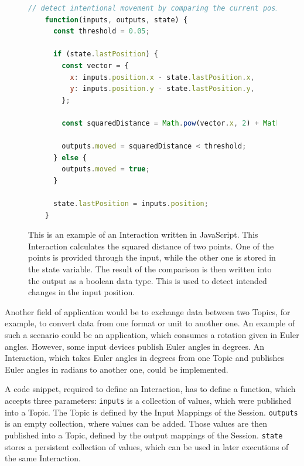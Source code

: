 \begin{figure}[H]
	\begin{lstlisting}[language=JavaScript]
    // detect intentional movement by comparing the current position with a previous one
    function(inputs, outputs, state) {
      const threshold = 0.05;

      if (state.lastPosition) {
        const vector = {
          x: inputs.position.x - state.lastPosition.x,
          y: inputs.position.y - state.lastPosition.y,
        };

        const squaredDistance = Math.pow(vector.x, 2) + Math.pow(vector.y, 2);

        outputs.moved = squaredDistance < threshold;
      } else {
        outputs.moved = true;
      }

      state.lastPosition = inputs.position;
    }
  \end{lstlisting}
	\caption[A UBII Interaction in JavaScript]{This is an example of an Interaction written in JavaScript. This Interaction calculates the squared distance of two points. One of the points is provided through the input, while the other one is stored in the state variable. The result of the comparison is then written into the output as a boolean data type. This is used to detect intended changes in the input position.}\label{fig:ubii-interaction-example}
\end{figure}

Another field of application would be to exchange data between two Topics, for example, to convert data from one format or unit to another one. An example of such a scenario could be an application, which consumes a rotation given in Euler angles. %
However, some input devices publish Euler angles in degrees. An Interaction, which takes Euler angles in degrees from one Topic and publishes Euler angles in radians to another one, could be implemented.


A code snippet, required to define an Interaction, has to define a function, which accepts three parameters:
\lstinline{inputs} is a collection of values, which were published into a Topic. The Topic is defined by the Input Mappings of the Session. \lstinline{outputs} is an empty collection, where values can be added. Those values are then published into a Topic, defined by the output mappings of the Session. \lstinline{state} stores a persistent collection of values, which can be used in later executions of the same Interaction.